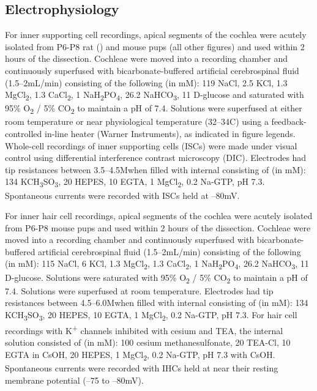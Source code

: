 \documentclass[9pt,lineno]{elife}
\begin{document}
\subsection{Electrophysiology}
For inner supporting cell recordings, apical segments of the cochlea were acutely isolated from P6-P8 rat () and mouse pups (all other figures) and used within 2 hours of the dissection. Cochleae were moved into a recording chamber and continuously superfused with bicarbonate-buffered artificial cerebrospinal fluid (1.5--2mL/min) consisting of the following (in mM): 119 NaCl, 2.5 KCl, 1.3 MgCl\textsubscript{2}, 1.3 CaCl\textsubscript{2}, 1 NaH\textsubscript{2}PO\textsubscript{4}, 26.2 NaHCO\textsubscript{3}, 11 D-glucose and saturated with 95\% O\textsubscript{2} / 5\% CO\textsubscript{2} to maintain a pH of 7.4. Solutions were superfused at either room temperature or near physiological temperature (32--34\textdegree C) using a feedback-controlled in-line heater (Warner Instruments), as indicated in figure legends.  Whole-cell recordings of inner supporting cells (ISCs) were made under visual control using differential interference contrast microscopy (DIC). Electrodes had tip resistances between 3.5--4.5M\textohm \hspace{0.5mm}when filled with internal consisting of (in mM): 134 KCH\textsubscript{3}SO\textsubscript{3}, 20 HEPES, 10 EGTA, 1 MgCl\textsubscript{2}, 0.2 Na-GTP, pH 7.3. Spontaneous currents were recorded with ISCs held at --80mV.

For inner hair cell recordings, apical segments of the cochlea were acutely isolated from P6-P8 mouse pups and used within 2 hours of the dissection. Cochleae were moved into a recording chamber and continuously superfused with bicarbonate-buffered artificial cerebrospinal fluid (1.5--2mL/min) consisting of the following (in mM): 115 NaCl, 6 KCl, 1.3 MgCl\textsubscript{2}, 1.3 CaCl\textsubscript{2}, 1 NaH\textsubscript{2}PO\textsubscript{4}, 26.2 NaHCO\textsubscript{3}, 11 D-glucose. Solutions were saturated with 95\% O\textsubscript{2} / 5\% CO\textsubscript{2} to maintain a pH of 7.4. Solutions were superfused at room temperature.  Electrodes had tip resistances between 4.5--6.0M\textohm \hspace{0.5mm}when filled with internal consisting of (in mM): 134 KCH\textsubscript{3}SO\textsubscript{3}, 20 HEPES, 10 EGTA, 1 MgCl\textsubscript{2}, 0.2 Na-GTP, pH 7.3. For hair cell recordings with K\textsuperscript{+} channels inhibited with cesium and TEA, the internal solution consisted of (in mM): 100 cesium methanesulfonate, 20 TEA-Cl, 10 EGTA in CsOH, 20 HEPES, 1 MgCl\textsubscript{2}, 0.2 Na-GTP, pH 7.3 with CsOH. Spontaneous currents were recorded with IHCs held at near their resting membrane potential (--75 to --80mV).
\end{document}
